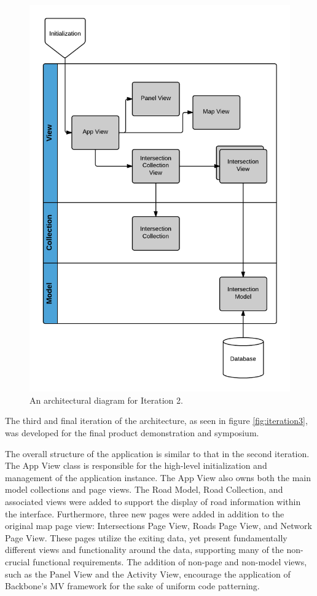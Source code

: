 \documentclass{report}
\begin{document}
\begin{figure}[htbp!]
  \begin{centering}
    \includegraphics[scale=0.25]{figures/Iteration-2.png}
    \caption{An architectural diagram for Iteration 2.}
    \label{fig:iteration2}
  \end{centering}
\end{figure}

The third and final iteration of the architecture, as seen in figure \ref{fig:iteration3}, was developed for the final product demonstration and symposium.

The overall structure of the application is similar to that in the second iteration. The App View class is responsible for the high-level initialization and management of the application instance. The App View also owns both the main model collections and page views. The Road Model, Road Collection, and associated views were added to support the display of road information within the interface. Furthermore, three new pages were added in addition to the original map page view: Intersections Page View, Roads Page View, and Network Page View. These pages utilize the exiting data, yet present fundamentally different views and functionality around the data, supporting many of the non-crucial functional requirements. The addition of non-page and non-model views, such as the Panel View and the Activity View, encourage the application of Backbone's MV framework for the sake of uniform code patterning.
\end{document}
